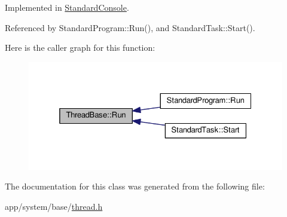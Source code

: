 Implemented in \hyperlink{classStandardConsole_a9380023bba612b816b134589130bb254}{Standard\+Console}.



Referenced by Standard\+Program\+::\+Run(), and Standard\+Task\+::\+Start().



Here is the caller graph for this function\+:
\nopagebreak
\begin{figure}[H]
\begin{center}
\leavevmode
\includegraphics[width=325pt]{da/d67/classThreadBase_a795d258c1f40c123859d0e83dce6a0ad_icgraph}
\end{center}
\end{figure}




The documentation for this class was generated from the following file\+:\begin{DoxyCompactItemize}
\item 
app/system/base/\hyperlink{thread_8h}{thread.\+h}\end{DoxyCompactItemize}
